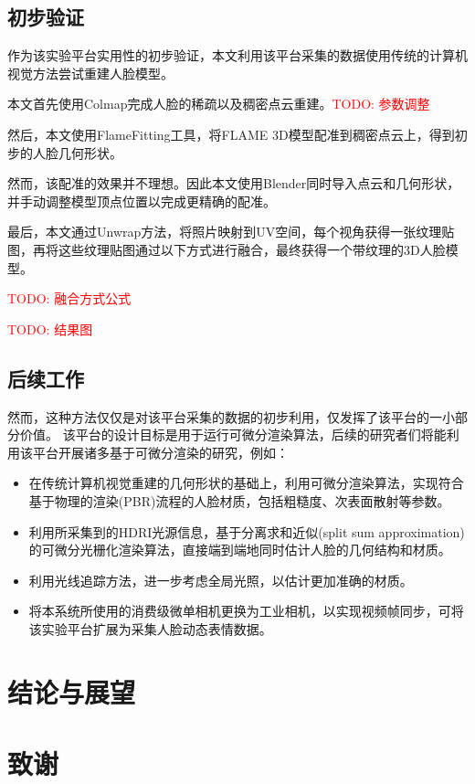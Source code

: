 \documentclass{scutmaster}
\newcommand{\TODO}[1]{\textcolor{red}{TODO: #1}}
\begin{document}
\section{初步验证}

作为该实验平台实用性的初步验证，本文利用该平台采集的数据使用传统的计算机视觉方法尝试重建人脸模型。

本文首先使用Colmap完成人脸的稀疏以及稠密点云重建。\TODO{参数调整}

然后，本文使用FlameFitting工具，将FLAME 3D模型配准到稠密点云上，得到初步的人脸几何形状。

然而，该配准的效果并不理想。因此本文使用Blender同时导入点云和几何形状，并手动调整模型顶点位置以完成更精确的配准。

最后，本文通过Unwrap方法，将照片映射到UV空间，每个视角获得一张纹理贴图，再将这些纹理贴图通过以下方式进行融合，最终获得一个带纹理的3D人脸模型。

\TODO{融合方式公式}

\TODO{结果图}

\section{后续工作}

然而，这种方法仅仅是对该平台采集的数据的初步利用，仅发挥了该平台的一小部分价值。
该平台的设计目标是用于运行可微分渲染算法，后续的研究者们将能利用该平台开展诸多基于可微分渲染的研究，例如：
\begin{itemize}
\item 在传统计算机视觉重建的几何形状的基础上，利用可微分渲染算法，实现符合基于物理的渲染(PBR)流程的人脸材质，包括粗糙度、次表面散射等参数。
\item 利用所采集到的HDRI光源信息，基于分离求和近似(split sum approximation)的可微分光栅化渲染算法，直接端到端地同时估计人脸的几何结构和材质。
\item 利用光线追踪方法，进一步考虑全局光照，以估计更加准确的材质。
\item 将本系统所使用的消费级微单相机更换为工业相机，以实现视频帧同步，可将该实验平台扩展为采集人脸动态表情数据。
\end{itemize}

\chapter{结论与展望}
\label{chap:conclusion}

\backmatter


\chapter{致谢}
\end{document}
